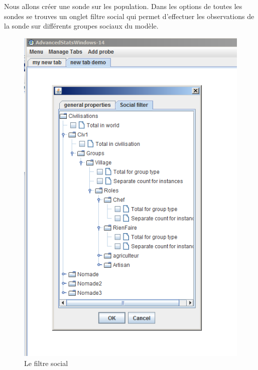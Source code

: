 Nous allons créer une sonde sur les population.
Dans les options de toutes les sondes se trouves un onglet filtre social qui permet d'effectuer les observations de la sonde sur différents groupes sociaux du modèle.
\newpage
\begin{figure}[!ht]
\begin{center}
\includegraphics[scale=0.7]{DocumentationSimulation/images/ADVS_SocFilter.png}
\caption[observe]{Le filtre social\\}
\label{observe10}
\end{center}
\end{figure} 

